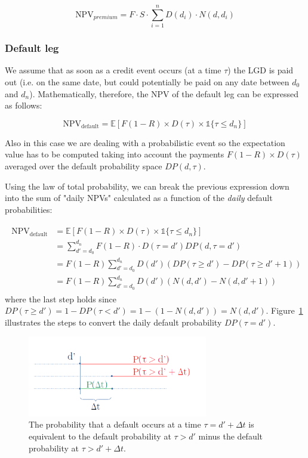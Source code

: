 \begin{equation}
	\textrm{NPV}_{premium} = F\cdot S \cdot \sum_{i=1}^{n} D(d_i) \cdot N(d, d_i)
\end{equation}

\subsubsection{Default leg}\label{default-leg}

We assume that as soon as a credit event occurs (at a time $\tau$) the LGD is paid out (i.e. on the same date, but could potentially be paid on any date between \(d_0\) and \(d_n\)). Mathematically, therefore, the NPV of the default leg can be expressed as follows:

\begin{equation}
\mathrm{NPV_{default}} =\mathbb{E}[F(1-R) \times D(\tau) \times \mathbb{1} \{\tau \leq d_n\} ]
\end{equation}

Also in this case we are dealing with a probabilistic event so the expectation value has to be computed taking into account the payments $F(1-R)\times D(\tau)$ averaged over the default probability space $DP(d, \tau)$. 

Using the law of total probability, we can break the previous expression down into the sum
of "daily NPVs" calculated as a function of the \emph{daily} default
probabilities:

\begin{align}
\begin{split}
\mathrm{NPV_{default}} &= \mathbb{E}[F(1-R) \times D(\tau) \times \mathbb{1}\{\tau \leq d_n\} ] \\
&= \sum_{d'=d_0}^{d_n} F(1-R) \cdot D(\tau = d') DP(d, \tau = d') \\
&= F(1-R) \sum_{d'=d_0}^{d_n} D(d') \left(DP(\tau \geq d') - DP( \tau \geq d'+1) \right) \\
&= F(1-R) \sum_{d'=d_0}^{d_n} D(d') \left( N(d, d') - N(d, d'+1) \right)
\end{split}
\end{align}
where the last step holds since $DP(\tau\geq d') = 1 - DP(\tau < d') = 1 - (1-N(d, d')) = N(d, d')$. 
Figure~\ref{fig:default_p} illustrates the steps to convert the daily default probability $DP(\tau=d')$.

\begin{figure}[htb]
	\centering
	\includegraphics[width=0.7\textwidth]{figures/timeline.png}
	\caption{The probability that a default occurs at a time $\tau = d'+\Delta t$ is equivalent to the default probability at $\tau > d'$ minus the default probability at $\tau>d'+\Delta t$.}
	\label{fig:default_p}
\end{figure}

